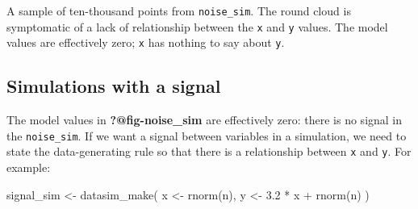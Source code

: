 \documentclass[
  letterpaper,
  DIV=11,
  numbers=noendperiod,
  oneside]{scrartcl}
\newenvironment{Shaded}{\begin{snugshade}}{\end{snugshade}}
\newcommand{\FloatTok}[1]{\textcolor[rgb]{0.68,0.00,0.00}{#1}}
\newcommand{\FunctionTok}[1]{\textcolor[rgb]{0.28,0.35,0.67}{#1}}
\newcommand{\NormalTok}[1]{\textcolor[rgb]{0.00,0.23,0.31}{#1}}
\newcommand{\OtherTok}[1]{\textcolor[rgb]{0.00,0.23,0.31}{#1}}
\newcommand{\SpecialCharTok}[1]{\textcolor[rgb]{0.37,0.37,0.37}{#1}}
\begin{document}
\begin{marginfigure}


\caption{\label{fig-noise-sim}A sample of ten-thousand points from
\texttt{noise\_sim}. The round cloud is symptomatic of a lack of
relationship between the \texttt{x} and \texttt{y} values. The model
values are effectively zero; \texttt{x} has nothing to say about
\texttt{y}.}

\end{marginfigure}%

\subsection{Simulations with a signal}\label{simulations-with-a-signal}

The model values in \textbf{?@fig-noise\_sim} are effectively zero:
there is no signal in the \texttt{noise\_sim}. If we want a signal
between variables in a simulation, we need to state the data-generating
rule so that there is a relationship between \texttt{x} and \texttt{y}.
For example:

\begin{Shaded}
\begin{Highlighting}[]
\NormalTok{signal\_sim }\OtherTok{\textless{}{-}} \FunctionTok{datasim\_make}\NormalTok{(}
\NormalTok{  x }\OtherTok{\textless{}{-}} \FunctionTok{rnorm}\NormalTok{(n),}
\NormalTok{  y }\OtherTok{\textless{}{-}} \FloatTok{3.2} \SpecialCharTok{*}\NormalTok{ x }\SpecialCharTok{+} \FunctionTok{rnorm}\NormalTok{(n)}
\NormalTok{)}
\end{Highlighting}
\end{Shaded}
\end{document}
